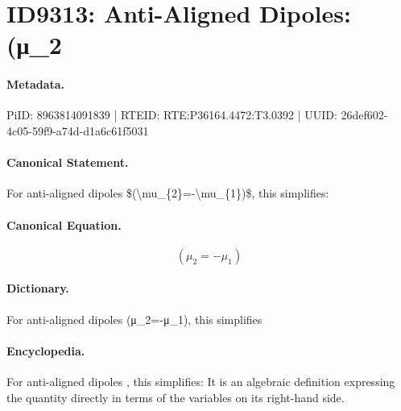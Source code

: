 \section*{ID9313: Anti-Aligned Dipoles: (μ\_2}
\paragraph{Metadata.}
PiID: 8963814091839 | RTEID: RTE:P36164.4472:T3.0392 | UUID: 26def602-4c05-59f9-a74d-d1a6c61f5031

\paragraph{Canonical Statement.}
For anti-aligned dipoles \$(\textbackslash{}mu\_\{2\}=-\textbackslash{}mu\_\{1\})\$, this simplifies:

\paragraph{Canonical Equation.}
\[
(\mu_{2}=-\mu_{1})
\]

\paragraph{Dictionary.}
For anti-aligned dipoles (μ\_2=-μ\_1), this simplifies

\paragraph{Encyclopedia.}
For anti-aligned dipoles , this simplifies: It is an algebraic definition expressing the quantity directly in terms of the variables on its right-hand side.
